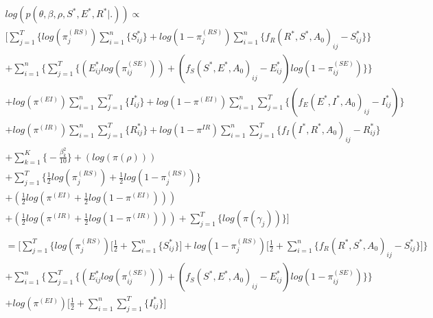 \documentclass[12pt]{article}
\begin{document}
\begin{center}
\begin{multline}
\displaystyle
log(p(\theta,\beta,\rho,S^*,E^*,R^*|.)) \propto\\ \Bigg[ 
            \sum_{j=1}^T\Big\{log(\pi_j^{(RS)})\sum_{i=1}^n\{S^*_{ij}\} + 
            log(1-\pi_j^{(RS)})\sum_{i=1}^n\{f_R(R^*, S^*, A_0)_{ij} - S^*_{ij}\}\Big\} \\ 
            +\sum_{i=1}^n \bigg\{ \sum_{j=1}^T\Big\{
            (E^*_{ij}log(\pi_{ij}^{(SE)})) + (f_S(S^*, E^*, A_0)_{ij} - E^*_{ij})log(1-\pi_{ij}^{(SE)})\Big\}\bigg\} \\
            + log(\pi^{(EI)})\sum_{i=1}^n\sum_{j=1}^T\{I^*_{ij}\} 
            + log(1-\pi^{(EI)})\sum_{i=1}^n\sum_{j=1}^T\{(f_E(E^*, I^*, A_0)_{ij} - I^*_{ij})\}\\
            + log(\pi^{(IR)})\sum_{i=1}^n\sum_{j=1}^T\{R^*_{ij}\} + 
            log(1-\pi^{IR})\sum_{i=1}^n\sum_{j=1}^T\{ f_I(I^*, R^*, A_0)_{ij} - R^*_{ij}\}\\
            + \sum_{k = 1}^K\bigg\{-\frac{\beta^2_k}{10}\bigg\}
            + (log(\pi(\rho)))\\
            +  \sum_{j=1}^{T} \bigg\{\frac{1}{2}log(\pi^{(RS)}_j) + \frac{1}{2}log(1-\pi^{(RS)}_j)   \bigg\} \\
            + (\frac{1}{2}log(\pi^{(EI)} + \frac{1}{2}log(1-\pi^{(EI)}))) \\
            + (\frac{1}{2}log(\pi^{(IR)} + \frac{1}{2}log(1-\pi^{(IR)})))   
            + \sum_{j=1}^{T} \bigg\{ log(\pi(\gamma_j)) \bigg\}\Bigg]\\
\end{multline}
\begin{multline}
\displaystyle
= \Bigg[ 
    \sum_{j=1}^T\Big\{log(\pi_j^{(RS)})\Big[\frac{1}{2} + \sum_{i=1}^n\{S^*_{ij}\}\Big] + 
            log(1-\pi_j^{(RS)})\Big[\frac{1}{2} + \sum_{i=1}^n\{f_R(R^*, S^*, A_0)_{ij} - S^*_{ij}\}\Big]\Big\}\\ 
            +\sum_{i=1}^n \bigg\{ \sum_{j=1}^T\Big\{
            (E^*_{ij}log(\pi_{ij}^{(SE)})) + (f_S(S^*, E^*, A_0)_{ij} - E^*_{ij})log(1-\pi_{ij}^{(SE)})\Big\}\bigg\} \\
            + log(\pi^{(EI)})\Big[\frac{1}{2} + \sum_{i=1}^n\sum_{j=1}^T\{I^*_{ij}\}\Big] 

\end{multline}
\end{center}
\end{document}
